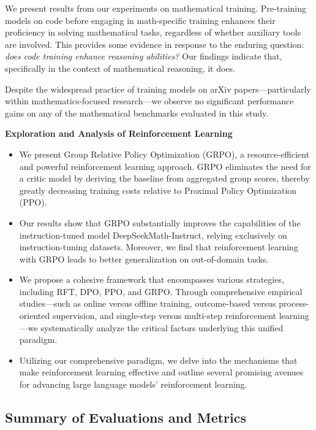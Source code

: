 \item We present results from our experiments on mathematical training. Pre-training models on code before engaging in math-specific training enhances their proficiency in solving mathematical tasks, regardless of whether auxiliary tools are involved. This provides some evidence in response to the enduring question: \textit{does code training enhance reasoning abilities?} Our findings indicate that, specifically in the context of mathematical reasoning, it does.

\item Despite the widespread practice of training models on arXiv papers—particularly within mathematics-focused research—we observe no significant performance gains on any of the mathematical benchmarks evaluated in this study.

\textbf{Exploration and Analysis of Reinforcement Learning}

\begin{itemize}[topsep=0pt]
    \item We present Group Relative Policy Optimization (GRPO), a resource-efficient and powerful reinforcement learning approach. GRPO eliminates the need for a critic model by deriving the baseline from aggregated group scores, thereby greatly decreasing training costs relative to Proximal Policy Optimization (PPO).
    \item Our results show that GRPO substantially improves the capabilities of the instruction-tuned model DeepSeekMath-Instruct, relying exclusively on instruction-tuning datasets. Moreover, we find that reinforcement learning with GRPO leads to better generalization on out-of-domain tasks.
    \item We propose a cohesive framework that encompasses various strategies, including RFT, DPO, PPO, and GRPO. Through comprehensive empirical studies—such as online versus offline training, outcome-based versus process-oriented supervision, and single-step versus multi-step reinforcement learning—we systematically analyze the critical factors underlying this unified paradigm.
    \item Utilizing our comprehensive paradigm, we delve into the mechanisms that make reinforcement learning effective and outline several promising avenues for advancing large language models’ reinforcement learning.
\end{itemize}

\subsection{Summary of Evaluations and Metrics}

